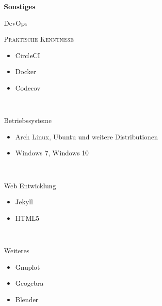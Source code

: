 \documentclass[8pt]{article}
\newcommand{\cvEducationHeading}[2]{%
  \textbf{#1} \hfill \textit{\footnotesize #2} \\[1em]
}
\newenvironment{cvEducationItem}[2]{
  \begin{minipage}[t]{\textwidth}
  \begin{minipage}[t]{0.1\textwidth}
    \raggedleft
    \small
    #1
  \end{minipage}
  \quad
  \vrule
  \quad
  \begin{minipage}[t]{0.8\textwidth}
    \textsc{\small #2}
    \begin{itemize}
      \itemsep0pt
      \footnotesize
}{
    \end{itemize}
  \end{minipage}
  \end{minipage}\\[1em]
}
\begin{document}
  \cvEducationHeading{Sonstiges}{}
  \begin{cvEducationItem}{DevOps}{Praktische Kenntnisse}
    \item CircleCI
    \item Docker
    \item Codecov
  \end{cvEducationItem}
  \begin{cvEducationItem}{Betriebssysteme}{}
    \item Arch Linux, Ubuntu und weitere Distributionen
    \item Windows 7, Windows 10
  \end{cvEducationItem}
  \begin{cvEducationItem}{Web Entwicklung}{}
    \item Jekyll
    \item HTML5
  \end{cvEducationItem}
  \begin{cvEducationItem}{Weiteres}{}
    \item Gnuplot
    \item Geogebra
    \item Blender
  \end{cvEducationItem}
\end{document}
